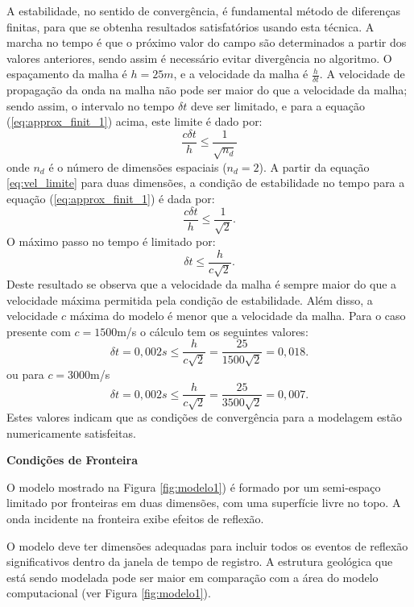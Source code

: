 A estabilidade, no sentido de convergência, é fundamental método de diferenças finitas, para que se obtenha resultados satisfatórios usando esta técnica. A marcha no tempo é que o próximo valor do campo são determinados a partir dos valores anteriores, sendo assim é necessário evitar divergência no algoritmo. O espaçamento da malha é $h=25 m$, e a velocidade da malha é $\frac{h}{\delta t}$. A velocidade de propagação da onda na malha não pode ser maior do que a velocidade da malha; sendo assim, o intervalo no tempo $\delta t$ deve ser limitado, e para a equação (\ref{eq:approx_finit_1}) acima, este limite é dado por:
\begin{equation}
\frac{c\delta t}{h}\leq \frac{1}{\sqrt{n_{d}}}
\label{eq:vel_limite}
\end{equation}
onde $n_{d}$ é o número de dimensões espaciais ($n_{d}=2$).
A partir da equação \ref{eq:vel_limite} para duas dimensões, a condição de estabilidade no tempo para a equação (\ref{eq:approx_finit_1}) é dada por:
\begin{equation}
\frac{c\delta t}{h}\leq \frac{1}{\sqrt{2}}.
\end{equation}
O máximo passo no tempo é limitado por:
\begin{equation}
\delta t\leq \frac{h}{c\sqrt{2}}.
\label{eq:estabilidade}
\end{equation}
Deste resultado se observa que a velocidade da malha é sempre maior do que a velocidade máxima permitida pela condição de estabilidade. Além disso, a velocidade $c$ máxima do modelo é menor que a velocidade da malha. Para o caso presente com $c=1500$m/s o cálculo tem os seguintes valores:
\begin{equation}
\delta t=0,002 s\leq \frac{h}{c\sqrt{2}}=\frac{25}{1500\sqrt{2}}=0,018.
\label{eq:estabilidade_1500}
\end{equation}
ou para $c=3000$m/s
\begin{equation}
\delta t=0,002 s\leq \frac{h}{c\sqrt{2}}=\frac{25}{3500\sqrt{2}}=0,007.
\label{eq:estabilidade_3500}
\end{equation}
Estes valores indicam que as condições de convergência para a modelagem estão numericamente satisfeitas.

\textbf{Condições de Fronteira}

O modelo  mostrado na Figura \ref{fig:modelo1}) é formado por um semi-espaço limitado por fronteiras em duas dimensões, com uma superfície livre no topo. A onda incidente na fronteira exibe efeitos de  reflexão.

O modelo deve ter dimensões adequadas para incluir todos os eventos de reflexão significativos dentro da janela de tempo de registro. A estrutura geológica que está sendo modelada pode ser maior em comparação com a área do modelo computacional (ver Figura \ref{fig:modelo1}).

